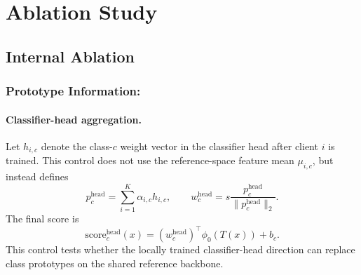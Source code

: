 \documentclass[letterpaper]{article}
\begin{document}
\section{Ablation Study}

\subsection{Internal Ablation}

\subsubsection{Prototype Information:}

\paragraph{Classifier-head aggregation.}
Let $h_{i,c}$ denote the class-$c$ weight vector in the classifier head after client $i$ is trained. This control does not use the reference-space feature mean $\mu_{i,c}$, but instead defines
\begin{equation}
p_c^{\mathrm{head}}=\sum_{i=1}^{K}\alpha_{i,c}h_{i,c},
\qquad
w_c^{\mathrm{head}}=s\frac{p_c^{\mathrm{head}}}{\|p_c^{\mathrm{head}}\|_2}.
\end{equation}
The final score is
\begin{equation}
\mathrm{score}_c^{\mathrm{head}}(x)
=\left(w_c^{\mathrm{head}}\right)^\top\phi_0(T(x))+b_c.
\end{equation}
This control tests whether the locally trained classifier-head direction can replace class prototypes on the shared reference backbone.

\end{document}
